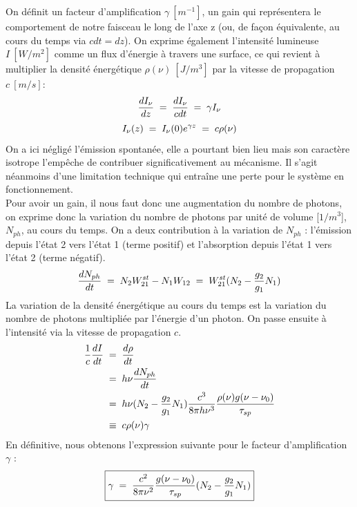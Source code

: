 On définit un facteur d'amplification $\gamma\ [m^{-1}]$, un gain qui représentera le comportement de notre faisceau le long de l'axe z (ou, de façon équivalente, au cours du temps via $cdt = dz$). On exprime également l'intensité lumineuse $I\ [W/m^2]$ comme un flux d'énergie à travers une surface, ce qui revient à multiplier la densité énergétique $\rho(\nu)\ [J/m^3]$ par la vitesse de propagation $c\ [m/s]$:
\begin{equation*}
    \dfrac{dI_\nu}{dz} \; = \; \dfrac{dI_\nu}{cdt} \; = \; \gamma I_\nu
\end{equation*}
\begin{equation*}
    I_\nu(z) \; = \; I_\nu(0) e^{\gamma z} \; = \; c\rho(\nu)
\end{equation*}
On a ici négligé l'émission spontanée, elle a pourtant bien lieu mais son caractère isotrope l'empêche de contribuer significativement au mécanisme. Il s'agit néanmoins d'une limitation technique qui entraîne une perte pour le système en fonctionnement.\\
Pour avoir un gain, il nous faut donc une augmentation du nombre de photons, on exprime donc la variation du nombre de photons par unité de volume [$1/m^3$], $N_{ph}$, au cours du temps. On a deux contribution à la variation de $N_{ph}$ : l'émission depuis l'état 2 vers l'état 1 (terme positif) et l'absorption depuis l'état 1 vers l'état 2 (terme négatif).
\begin{equation*}
    \dfrac{dN_{ph}}{dt} 
    \; = \; N_2 W_{21}^{st} - N_1 W_{12}
    \; = \; W_{21}^{st} (N_2 - \dfrac{g_2}{g_1}N_1)
\end{equation*}
La variation de la densité énergétique au cours du temps est la variation du nombre de photons multipliée par l'énergie d'un photon. On passe ensuite à l'intensité via la vitesse de propagation $c$.
\begin{align*}
    \dfrac{1}{c}\dfrac{dI}{dt}
    &\; = \;  \dfrac{d\rho}{dt}\\
    &\; = \;  h\nu\dfrac{dN_{ph}}{dt}\\
    &\; = \;  h\nu (N_2 - \dfrac{g_2}{g_1}N_1) \dfrac{c^3}{8\pi h \nu^3}\dfrac{\rho(\nu) g(\nu - \nu_0)}{\tau_{sp}}\\
    &\;\equiv\;  c\rho(\nu)\gamma
\end{align*}
En définitive, nous obtenons l'expression suivante pour le facteur d'amplification $\gamma$ :
\begin{equation}
    \boxed{
        \gamma \; = \; \dfrac{c^2}{8\pi\nu^2}\dfrac{g(\nu - \nu_0)}{\tau_{sp}}(N_2 - \dfrac{g_2}{g_1}N_1)
    }
\end{equation}
